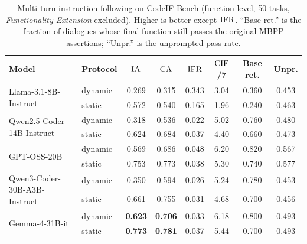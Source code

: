 \begin{table}[t]
\centering
\small
\caption{Multi-turn instruction following on CodeIF-Bench (function level, 50
tasks, \emph{Functionality Extension} excluded). Higher is better except
$\mathrm{IFR}$. ``Base ret.'' is the fraction of dialogues whose final function still
passes the original MBPP assertions; ``Unpr.'' is the unprompted pass rate.}
\label{tab:mtif-main}
\begin{tabular}{llcccccc}
\toprule
Model & Protocol & $\mathrm{IA}$ & $\mathrm{CA}$ & $\mathrm{IFR}$ & $\mathrm{CIF}$/7 & Base ret. & Unpr. \\
\midrule
\multirow{2}{*}{Llama-3.1-8B-Instruct}
  & dynamic & 0.269 & 0.315 & 0.343 & 3.04 & 0.360 & 0.453 \\
  & static  & 0.572 & 0.540 & 0.165 & 1.96 & 0.240 & 0.463 \\
\multirow{2}{*}{Qwen2.5-Coder-14B-Instruct}
  & dynamic & 0.318 & 0.536 & 0.022 & 5.02 & 0.760 & 0.480 \\
  & static  & 0.624 & 0.684 & 0.037 & 4.40 & 0.660 & 0.473 \\
\multirow{2}{*}{GPT-OSS-20B}
  & dynamic & 0.569 & 0.686 & 0.048 & 6.20 & 0.820 & 0.567 \\
  & static  & 0.753 & 0.773 & 0.038 & 5.30 & 0.740 & 0.577 \\
\multirow{2}{*}{Qwen3-Coder-30B-A3B-Instruct}
  & dynamic & 0.350 & 0.594 & 0.026 & 5.24 & 0.780 & 0.453 \\
  & static  & 0.661 & 0.755 & 0.031 & 4.68 & 0.700 & 0.456 \\
\multirow{2}{*}{Gemma-4-31B-it}
  & dynamic & \textbf{0.623} & \textbf{0.706} & 0.033 & 6.18 & 0.800 & 0.493 \\
  & static  & \textbf{0.773} & \textbf{0.781} & 0.037 & 5.44 & 0.700 & 0.493 \\
\bottomrule
\end{tabular}
\end{table}

